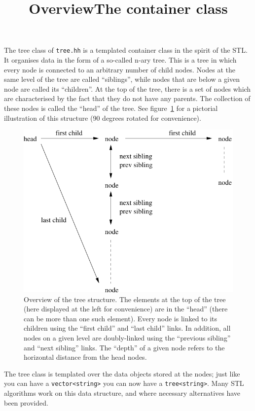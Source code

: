 \documentclass[11pt]{kasper}
\begin{document}
\begin{sectionunit}
\title{Overview}
\maketitle
\begin{sectionunit}
\title{The container class}
\maketitle
The tree class of {\tt tree.hh} is a templated container class in the
spirit of the STL. It organises data in the form of a so-called n-ary
tree. This is a tree in which every node is connected to an arbitrary
number of child nodes. Nodes at the same level of the tree are called
``siblings'', while nodes that are below a given node are called its
``children''. At the top of the tree, there is a set of nodes which
are characterised by the fact that they do not have any parents. The
collection of these nodes is called the ``head'' of the tree. See
figure~\ref{f:overview} for a pictorial illustration of this
structure (90 degrees rotated for convenience).
\begin{figure}[th]
\begin{center}
\includegraphics[width=.5\textwidth]{treefig}
\caption{Overview of the tree structure. The elements at the top of
the tree (here displayed at the left for convenience) are in the
``head'' (there can be more than one such element).  Every node is
linked to its children using the ``first child'' and ``last child''
links. In addition, all nodes on a given level are doubly-linked using
the ``previous sibling'' and ``next sibling'' links. The ``depth'' of
a given node refers to the horizontal distance from the head nodes.}
\label{f:overview}
\end{center}
\end{figure}

The tree class is templated over the data objects stored at the nodes;
just like you can have a {\tt vector<string>} you can now have a
{\tt tree<string>}. Many STL algorithms work on this data structure,
and where necessary alternatives have been provided.
\medskip


\end{sectionunit}
\end{sectionunit}
\end{document}
